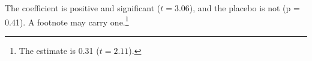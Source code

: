 \documentclass[letterpaper, 12pt]{article}
\begin{document}
\doublespacing
The coefficient is positive and significant ($t = 3.06$), and the placebo is not (p = 0.41).
A footnote may carry one.\footnote{The estimate is 0.31 ($t = 2.11$).}
\begin{table}
\caption{Notes may carry one too ($t = 1.9$).}
\end{table}
\end{document}
